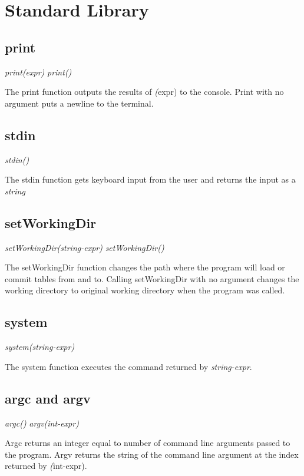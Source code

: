 \section{Standard Library}

\subsection{print}
\begin{center}
\textsl{print(expr)}
\textsl{print()}
\end{center}
The print function outputs the results of \textsl(expr) to the console. Print with no 
argument puts a newline to the terminal.

\subsection{stdin}
\begin{center}
\textsl{stdin()}
\end{center}
The stdin function gets keyboard input from the user and returns the input as a \textsl{string}

\subsection{setWorkingDir}
\begin{center}
\textsl{setWorkingDir(string-expr)}
\textsl{setWorkingDir()}
\end{center}
The setWorkingDir function changes the path where the program will load or commit tables from and to. 
Calling setWorkingDir with no argument changes the working directory to original working directory when 
the program was called.

\subsection{system}
\begin{center}
\textsl{system(string-expr)}
\end{center}
The system function executes the command returned by \textsl{string-expr}.

\subsection{argc and argv}
\begin{center}
\textsl{argc()}
\textsl{argv(int-expr)}
\end{center}
Argc returns an integer equal to number of command line arguments passed to the program. 
Argv returns the string of the command line argument at the index returned by \textsl(int-expr).

